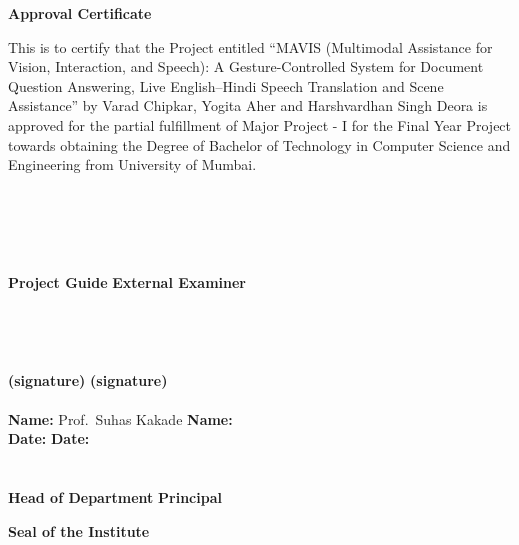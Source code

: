 \newpage
\thispagestyle{empty}
\vspace*{0.2cm}
\vspace{1cm}
\begin{center}
 \large\textbf{Approval Certificate}
\end{center}
\vspace{2cm}
This is to certify that the Project entitled ``MAVIS (Multimodal Assistance for Vision, Interaction, and Speech): A Gesture-Controlled System for Document Question Answering, Live English--Hindi Speech Translation and Scene Assistance'' by Varad Chipkar, Yogita Aher and Harshvardhan Singh Deora is approved  for the partial fulfillment of Major Project - I for the Final Year Project towards obtaining the Degree of Bachelor of Technology in Computer Science and Engineering from University of Mumbai.\\
\\
\\
\\
\\
\\
\textbf{Project Guide} \hspace{3.5in} \textbf{External Examiner}\\ 
\\
\\
\\
\\
\textbf {(signature)} \hspace{3.75in} \textbf{(signature)} \\
\\
\vspace{1cm}
\textbf {Name:} Prof.\ Suhas Kakade \hspace{2.3in} \textbf{Name:}\\ 
\vspace{1cm}
\textbf {Date:} \hspace{4.2in} \textbf{Date:}\\ 
\vspace{1cm}
\\
\\
\textbf {Head of Department} \hspace{3in} \textbf{Principal}\\ 
\vspace{2cm}
\begin{center}
\textbf{Seal of the Institute}\\
\end{center}

